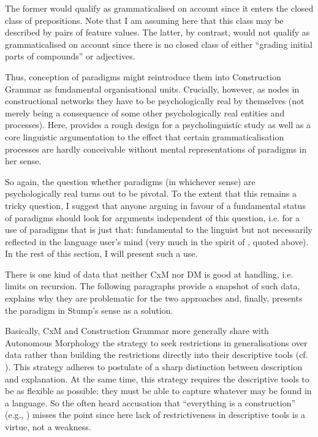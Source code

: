 \documentclass[output=paper]{langsci/langscibook}
\begin{document}
The former would qualify as grammaticalised on  account since it enters the closed class of prepositions. Note that I am assuming here that this class may be described by pairs of feature values. The latter, by contrast, would not qualify as grammaticalised on  account since there is no closed class of either “grading initial parts of compounds” or adjectives.

Thus,  conception of paradigms might reintroduce them into Construction Grammar as fundamental organisational units. Crucially, however, as nodes in constructional networks they have to be psychologically real by themselves (not merely being a consequence of some other psychologically real entities and processes). Here, \citet[306--310]{Diewald2020a} provides a rough design for a psycholinguistic study as well as a core linguistic argumentation to the effect that certain grammaticalisation processes are hardly conceivable without mental representations of paradigms in her sense.

So again, the question whether paradigms (in whichever sense) are psychologically real turns out to be pivotal. To the extent that this remains a tricky question, I suggest that anyone arguing in favour of a fundamental status of paradigms should look for arguments independent of this question, i.e. for a use of paradigms that is just that: fundamental to the linguist but not necessarily reflected in the language user’s mind (very much in the spirit of \citealt[197--198]{Aronoff2016}, quoted above). In the rest of this section, I will present such a use.

There is one kind of data that neither CxM nor DM is good at handling, i.e. limits on recursion. The following paragraphs provide a snapshot of such data, explains why they are problematic for the two approaches and, finally, presents the paradigm in Stump’s sense as a solution.

Basically, CxM and Construction Grammar more generally share with Autonomous Morphology the strategy to seek restrictions in generalisations over data rather than building the restrictions directly into their descriptive tools (cf. ). This strategy adheres to  postulate of a sharp distinction between description and explanation. At the same time, this strategy requires the descriptive tools to be as flexible as possible: they must be able to capture whatever may be found in a language. So the often heard accusation that “everything is a construction” (e.g.,  \citealt[236]{VanValin2007}) misses the point since here lack of restrictiveness in descriptive tools is a virtue, not a weakness.
\end{document}
